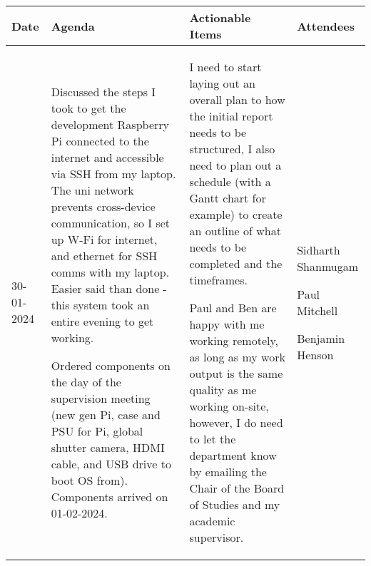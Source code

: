\begin{table}[!h]
    \centering
    \begin{tabularx}{\textwidth}{|l|X|X|X|}
        \hline
        Date & Agenda & Actionable Items & Attendees \\
        \hline
        \hline
        30-01-2024 & 
        \begin{myitemize}
            \item Discussed the steps I took to get the development Raspberry Pi connected to the internet and accessible via SSH from my laptop. The uni network prevents cross-device communication, so I set up W-Fi for internet, and ethernet for SSH comms with my laptop. Easier said than done - this system took an entire evening to get working.
            \item Ordered components on the day of the supervision meeting (new gen Pi, case and PSU for Pi, global shutter camera, HDMI cable, and USB drive to boot OS from). Components arrived on 01-02-2024.
        \end{myitemize} &
        \begin{myitemize}
            \item I need to start laying out an overall plan to how the initial report needs to be structured, I also need to plan out a schedule (with a Gantt chart for example) to create an outline of what needs to be completed and the timeframes.
            \item Paul and Ben are happy with me working remotely, as long as my work output is the same quality as me working on-site, however, I do need to let the department know by emailing the Chair of the Board of Studies and my academic supervisor.
        \end{myitemize} &
        \begin{myitemize}
            \item Sidharth Shanmugam
            \item Paul Mitchell
            \item Benjamin Henson
        \end{myitemize} \\
        \hline
    \end{tabularx}
\end{table}
